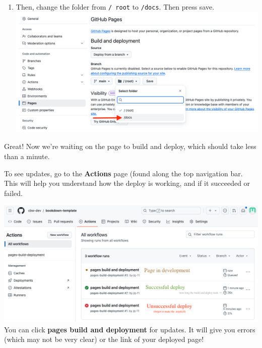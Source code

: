 \documentclass[
]{book}
\theoremstyle{definition}
\theoremstyle{definition}
\theoremstyle{definition}
\theoremstyle{definition}
\theoremstyle{remark}
\begin{document}
\begin{enumerate}
\item
  Then, change the folder from \texttt{/\ root} to \texttt{/docs}. Then press save.
  \includegraphics{img/git-instruct/github-deploy-docs.png}\\
\end{enumerate}

Great! Now we're waiting on the page to build and deploy, which should take less than a minute.

To see updates, go to the \textbf{Actions} page (found along the top navigation bar. This will help you understand how the deploy is working, and if it succeeded or failed.

\includegraphics{img/git-instruct/github-pages-actions-explained.png}\\

You can click \textbf{pages build and deployment} for updates. It will give you errors (which may not be very clear) or the link of your deployed page!
\end{document}
